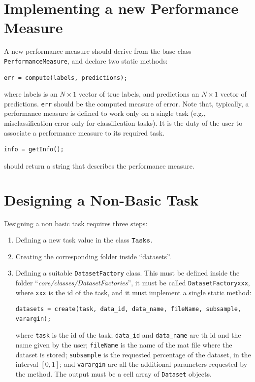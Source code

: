 \section{Implementing a new Performance Measure}
\label{sec:implementingperformancemeasures}

A new performance measure should derive from the base class \verb|PerformanceMeasure|, and declare two static methods:

\begin{lstlisting}
err = compute(labels, predictions);
\end{lstlisting}

\noindent where labels is an $N\times1$ vector of true labels, and predictions an $N\times1$ vector of predictions. \verb|err| should be the computed measure of error. Note that, typically, a performance measure is defined to work only on a single task (e.g., misclassification error only for classification tasks). It is the duty of the user to associate a performance measure to its required task.

\begin{lstlisting}
info = getInfo();
\end{lstlisting}

\noindent should return a string that describes the performance measure.

\section{Designing a Non-Basic Task}

Designing a non basic task requires three steps:

\begin{enumerate}
\item Defining a new task value in the class $\verb|Tasks|$.
\item Creating the corresponding folder inside ``datasets''.
\item Defining a suitable \verb|DatasetFactory| class. This must be defined inside the folder ``\textit{core/classes/DatasetFactories}'', it must be called \verb|DatasetFactoryxxx|, where \verb|xxx| is the id of the task, and it must implement a single static method:

\begin{lstlisting}
datasets = create(task, data_id, data_name, fileName, subsample, varargin);
\end{lstlisting}

\noindent where \verb|task| is the id of the task; \verb|data_id| and \verb|data_name| are th id and the name given by the user; \verb|fileName| is the name of the mat file where the dataset is stored; \verb|subsample| is the requested percentage of the dataset, in the interval $\left[0,1\right]$; and \verb|varargin| are all the additional parameters requested by the method. The output must be a cell array of \verb|Dataset| objects.
\end{enumerate}

